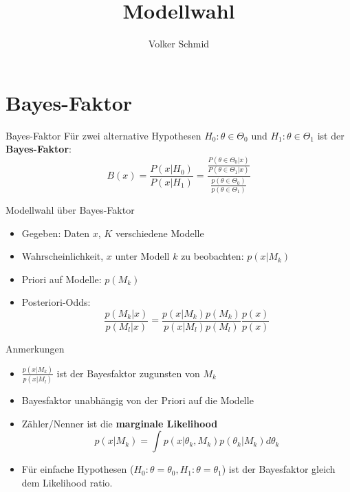 \documentclass[ignorenonframetext,]{beamer}
\title{Modellwahl}
\author{Volker Schmid}
\date{\begin{enumerate}
\def\labelenumi{\arabic{enumi}.}
\setcounter{enumi}{2}
\tightlist
\item
  Juli 2017
\end{enumerate}}
\begin{document}
\frame{\titlepage}

\begin{frame}
\tableofcontents[hideallsubsections]
\end{frame}

\section{Bayes-Faktor}\label{bayes-faktor}

\begin{frame}{Bayes-Faktor}
Für zwei alternative Hypothesen $H_0: \theta\in\Theta_0$ und $H_1: \theta\in\Theta_1$ ist der \textbf{Bayes-Faktor}:
\[
B(x) = \frac{P(x|H_0)}{P(x|H_1)}=\frac{\frac{P(\theta \in \Theta_0|x)}{P(\theta \in \Theta_1|x)}}{\frac{p(\theta\in\Theta_0)}{p(\theta\in\Theta_1)}}
\]
\end{frame}

\begin{frame}{Modellwahl über Bayes-Faktor}
\begin{itemize}
\item Gegeben: Daten $x$, $K$ verschiedene Modelle
\item Wahrscheinlichkeit, $x$ unter Modell $k$ zu beobachten: $p(x|M_k)$
\item Priori auf Modelle: $p(M_k)$
\item Posteriori-Odds:
\begin{equation*}
\frac{p(M_k|x)}{p(M_l|x)}=\frac{p(x|M_k)p(M_k)}{p(x|M_l)p(M_l)}\frac{p(x)}{p(x)}
\end{equation*}
\end{itemize}
\end{frame}

\begin{frame}{Anmerkungen}
\begin{itemize}
\item $\frac{p(x|M_k)}{p(x|M_l)}$ ist der Bayesfaktor zugunsten von $M_k$ 
\item Bayesfaktor unabhängig von der Priori auf die Modelle
\item Zähler/Nenner ist die \textbf{marginale Likelihood}
\begin{equation}
p(x|M_k)=\int p(x|\theta_k,M_k)p(\theta_k|M_k)d\theta_k
\end{equation}
\item Für einfache Hypothesen ($H_0:\theta=\theta_0, H_1:\theta=\theta_1$) ist der Bayesfaktor gleich dem Likelihood ratio.
\end{itemize}
\end{frame}
\end{document}
